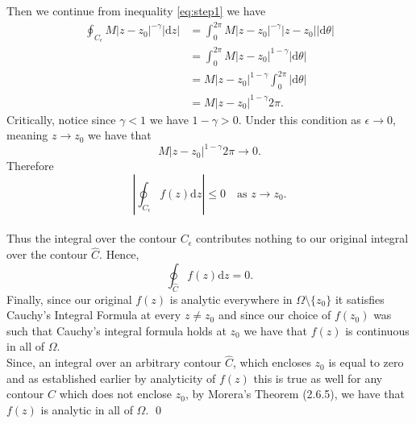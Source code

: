 \documentclass[10pt]{amsart}
\newcommand{\D}{\mathrm{d}}
\theoremstyle{nonumberplain}
\begin{document}
\begin{enumerate}[label={\bf {\arabic*}:}]
Then we continue from inequality \eqref{eq:step1} we have
\begin{align*}
\oint_{C_\epsilon} M |z - z_0|^{-\gamma} \left|\D z \right| &= \int_0^{2 \pi} M |z - z_0|^{-\gamma} |z - z_0||\D \theta| \\
	&= \int_0^{2 \pi} M |z - z_0|^{1-\gamma} |\D \theta| \\
	&= M |z - z_0|^{1-\gamma} \int_0^{2 \pi} |\D \theta| \\
	&= M |z - z_0|^{1-\gamma} 2 \pi.
\end{align*}
Critically, notice since $\gamma < 1$ we have $1 - \gamma > 0$.
Under this condition as $\epsilon \rightarrow 0$, meaning $z\rightarrow z_0$ we have that
$$M |z - z_0|^{1-\gamma} 2 \pi \rightarrow 0.$$
Therefore 
$$\left|\oint_{C_\epsilon} f(z)\D z \right| \leq 0 \quad \text{as $z\rightarrow z_0$}.$$
\\
Thus the integral over the contour $C_\epsilon$ contributes nothing to our original integral over the contour $\widehat C$.
Hence,
$$\oint_{\widehat C} f(z)\D z = 0.$$
Finally, since our original $f(z)$ is analytic everywhere in $\Omega \setminus \{z_0\}$ it satisfies Cauchy's Integral Formula at every $z \neq z_0$ and since our choice of $f(z_0)$ was such that Cauchy's integral formula holds at $z_0$ we have that $f(z)$ is continuous in all of $\Omega$. \\

\noindent
Since, an integral over an arbitrary contour $\widehat C$, which encloses $z_0$ is equal to zero and as established earlier by analyticity of $f(z)$ this is true as well for any contour $C$ which does not enclose $z_0$, by Morera's Theorem (2.6.5), we have that $f(z)$ is analytic in all of $\Omega$.
\qed \\


\end{enumerate}
\end{document}
